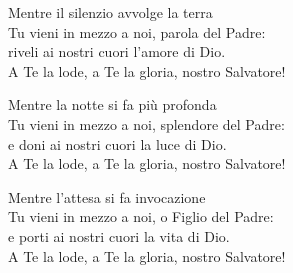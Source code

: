 

\spazio

\strofa Mentre il silenzio avvolge la terra\\
Tu vieni in mezzo a noi, parola del Padre:\\
riveli ai nostri cuori l'amore di Dio.\\
A Te la lode, a Te la gloria, nostro Salvatore!

\spazio


\spazio

\strofa Mentre la notte si fa più profonda\\
Tu vieni in mezzo a noi, splendore del Padre:\\
e doni ai nostri cuori la luce di Dio.\\
A Te la lode, a Te la gloria, nostro Salvatore!

\spazio


\spazio

\strofa Mentre l'attesa si fa invocazione\\
Tu vieni in mezzo a noi, o Figlio del Padre:\\
e porti ai nostri cuori la vita di Dio.\\
A Te la lode, a Te la gloria, nostro Salvatore!

\spazio

